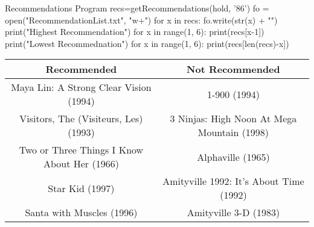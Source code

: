\documentclass[11pt]{report}
\begin{document}
\begin{mylisting}{Recommendations Program}
recs=getRecommendations(hold, '86')
fo = open("RecommendationList.txt", "w+")
for x in recs:
    fo.write(str(x) + "\n")
print("Highest Recommendation")
for x in range(1, 6):
    print(recs[x-1])
print("Lowest Recommednation")
for x in range(1, 6):
    print(recs[len(recs)-x])
\end{mylisting}
\begin{center}
\begin{tabular}{|c||c|}
\hline
 Recommended & Not Recommended \\ \hline
\hline
Maya Lin: A Strong Clear Vision (1994) & 1-900 (1994)\\ \hline
Visitors, The (Visiteurs, Les) (1993) & 3 Ninjas: High Noon At Mega Mountain (1998)\\ \hline
Two or Three Things I Know About Her (1966) & Alphaville (1965)\\ \hline
Star Kid (1997) & Amityville 1992: It's About Time (1992)\\ \hline
Santa with Muscles (1996) & Amityville 3-D (1983)\\ \hline
\end{tabular}
\end{center}
\end{document}
